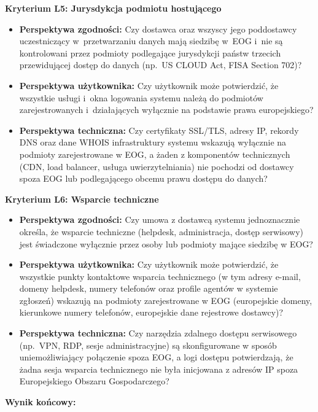 
\textbf{Kryterium L5: Jurysdykcja podmiotu hostującego}

\begin{itemize}
  \item \textbf{Perspektywa zgodności:} Czy dostawca oraz wszyscy jego poddostawcy
        uczestniczący w~przetwarzaniu danych mają siedzibę w~EOG i~nie są
        kontrolowani przez podmioty podlegające jurysdykcji państw trzecich
        przewidującej dostęp do danych (np.\ US CLOUD Act, FISA Section 702)?

  \item \textbf{Perspektywa użytkownika:} Czy użytkownik może potwierdzić,
        że wszystkie usługi i~okna logowania systemu należą do podmiotów
        zarejestrowanych i~działających wyłącznie na podstawie prawa
        europejskiego?

  \item \textbf{Perspektywa techniczna:} Czy certyfikaty SSL/TLS, adresy IP,
        rekordy DNS oraz dane WHOIS infrastruktury systemu wskazują wyłącznie
        na podmioty zarejestrowane w EOG, a żaden z komponentów technicznych
        (CDN, load balancer, usługa uwierzytelniania) nie pochodzi od dostawcy
        spoza EOG lub podlegającego obcemu prawu dostępu do danych?
\end{itemize}

\textbf{Kryterium L6: Wsparcie techniczne}

\begin{itemize}
  \item \textbf{Perspektywa zgodności:} Czy umowa z dostawcą systemu
        jednoznacznie określa, że wsparcie techniczne (helpdesk, administracja,
        dostęp serwisowy) jest świadczone wyłącznie przez osoby lub podmioty
        mające siedzibę w EOG?

\item \textbf{Perspektywa użytkownika:} Czy użytkownik może potwierdzić,
      że wszystkie punkty kontaktowe wsparcia technicznego (w tym adresy
      e-mail, domeny helpdesk, numery telefonów oraz profile agentów
      w systemie zgłoszeń) wskazują na podmioty zarejestrowane
      w EOG (europejskie domeny, kierunkowe numery telefonów,
      europejskie dane rejestrowe dostawcy)?

  \item \textbf{Perspektywa techniczna:} Czy narzędzia zdalnego dostępu
        serwisowego (np.\ VPN, RDP, sesje administracyjne) są skonfigurowane
        w sposób uniemożliwiający połączenie spoza EOG, a logi dostępu
        potwierdzają, że żadna sesja wsparcia technicznego nie była
        inicjowana z adresów IP spoza Europejskiego Obszaru Gospodarczego?
\end{itemize}
\bigskip
\textbf{Wynik końcowy:}

